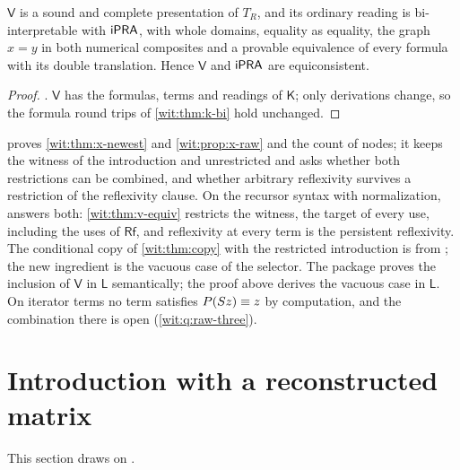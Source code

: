 \begin{corollary}
\label{wit:cor:v-bi}
$\mathsf V$ is a sound and complete presentation of $T_R$, and its ordinary
reading is bi-interpretable with $\mathsf{iPRA}$, with whole domains, equality as
equality, the graph $x=y$ in both numerical composites and a provable
equivalence of every formula with its double translation.  Hence
$\mathsf V$ and $\mathsf{iPRA}$ are equiconsistent.
\end{corollary}

\begin{proof}
.  $\mathsf V$ has the formulas, terms
and readings of $\mathsf K$; only derivations change, so the formula round
trips of \cref{wit:thm:k-bi} hold unchanged.
\end{proof}

\begin{remark}
\label{wit:rem:spec-packages}
 proves \cref{wit:thm:x-newest} and
\cref{wit:prop:x-raw} and the count of nodes; it keeps the witness of the
introduction and  unrestricted and asks whether both
restrictions can be combined, and whether arbitrary reflexivity survives a
restriction of the reflexivity clause.  On the recursor syntax with
normalization,  answers both:
\cref{wit:thm:v-equiv} restricts the witness, the target of every use,
including the uses of $\mathsf{Rf}$, and reflexivity at every term is the
persistent reflexivity.  The conditional copy of \cref{wit:thm:copy} with
the restricted introduction is from ; the new
ingredient is the vacuous case of the selector.  The package proves the
inclusion of $\mathsf V$ in $\mathsf L$ semantically; the proof above
derives the vacuous case in $\mathsf L$.  On iterator terms no term
satisfies $P(S z)\equiv z$ by computation, and the combination there is
open (\cref{wit:q:raw-three}).
\end{remark}

\section{Introduction with a reconstructed matrix}
\label{wit:sec:recon}

This section draws on .

